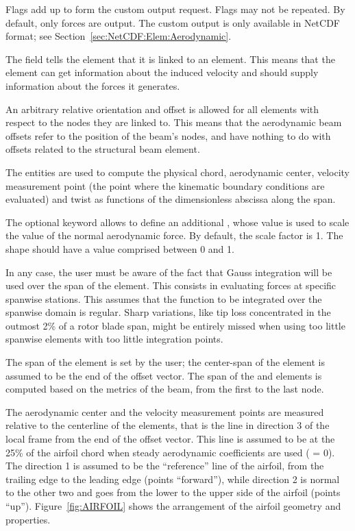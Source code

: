Flags add up to form the custom output request.
Flags may not be repeated.
By default, only forces are output.
The custom output is only available in NetCDF format;
see Section~\ref{sec:NetCDF:Elem:Aerodynamic}.

The field  tells the element that it is linked to an
 element.
This means that the element can get information about the
induced velocity and should supply information about the forces it generates.

An arbitrary relative orientation and offset is allowed for all elements with
respect to the nodes they are linked to. 
This means that the aerodynamic beam offsets refer to the position
of the beam's nodes, and have nothing to do with offsets related
to the structural beam element.

The  entities are used to compute the physical chord,
aerodynamic center, velocity measurement point (the point where the
kinematic boundary conditions are evaluated) and twist as functions 
of the dimensionless abscissa along the span.

The optional  keyword allows to define an additional ,
whose value is used to scale the value of the normal aerodynamic force.
By default, the scale factor is 1.
The  shape should have a value comprised between 0 and 1.

In any case, the user must be aware of the fact that Gauss integration
will be used over the span of the element.
This consists in evaluating forces at specific spanwise stations.
This assumes that the function to be integrated over the spanwise domain
is regular.
Sharp variations, like tip loss concentrated in the outmost 2\%
of a rotor blade span, might be entirely missed when using too little
spanwise elements with too little integration points.

The span of the  element is set by the user;
the center-span of the element is assumed to be the end of the offset vector.
The span of the  and  elements
is computed based on the metrics of the beam, from the first to the last node.

The aerodynamic center and the velocity measurement points are measured
relative to the centerline of the elements, that is the line in direction 3
of the local frame from the end of the offset vector.
This line is assumed to be at the 25\% of the airfoil chord when steady
aerodynamic coefficients are used ( = 0).
The direction 1 is assumed to be the ``reference'' line of the airfoil, 
from the trailing edge to the leading edge (points ``forward''),
while direction 2 is normal to the other two and goes from the lower 
to the upper side of the airfoil (points ``up''). 
Figure~\ref{fig:AIRFOIL} shows the arrangement of the airfoil geometry 
and properties.

